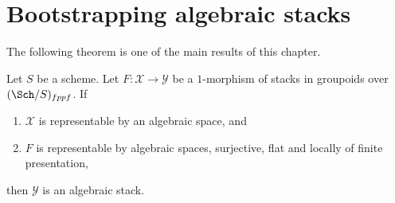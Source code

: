 \section{Bootstrapping algebraic stacks}
\label{section-bootstrap}

\noindent
The following theorem is one of the main results of this chapter.

\begin{theorem}
\label{theorem-bootstrap}
Let $S$ be a scheme. Let $F : \mathcal{X} \to \mathcal{Y}$
be a $1$-morphism of stacks in groupoids over $(\Sch/S)_{fppf}$. If
\begin{enumerate}
\item $\mathcal{X}$ is representable by an algebraic space, and
\item $F$ is representable by algebraic spaces, surjective, flat and
locally of finite presentation,
\end{enumerate}
then $\mathcal{Y}$ is an algebraic stack.
\end{theorem}

